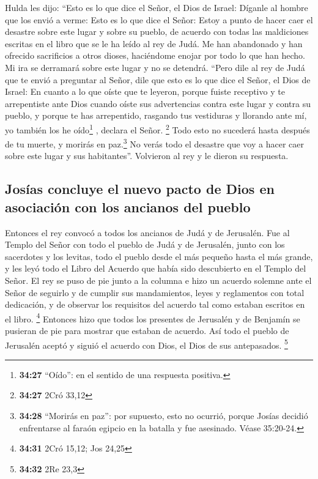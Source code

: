  Hulda les dijo: ``Esto es lo que dice el Señor, el Dios
de Israel: Díganle al hombre que los envió a verme:  Esto
es lo que dice el Señor: Estoy a punto de hacer caer el desastre sobre
este lugar y sobre su pueblo, de acuerdo con todas las maldiciones
escritas en el libro que se le ha leído al rey de Judá. 
Me han abandonado y han ofrecido sacrificios a otros dioses, haciéndome
enojar por todo lo que han hecho. Mi ira se derramará sobre este lugar y
no se detendrá.  ``Pero dile al rey de Judá que te envió
a preguntar al Señor, dile que esto es lo que dice el Señor, el Dios de
Israel: En cuanto a lo que oíste que te leyeron,  porque
fuiste receptivo y te arrepentiste ante Dios cuando oíste sus
advertencias contra este lugar y contra su pueblo, y porque te has
arrepentido, rasgando tus vestiduras y llorando ante mí, yo también los
he oído\footnote{\textbf{34:27} ``Oído'': en el sentido de una respuesta
  positiva.} , declara el Señor. \footnote{\textbf{34:27} 2Cró 33,12}
 Todo esto no sucederá hasta después de tu muerte, y
morirás en paz.\footnote{\textbf{34:28} ``Morirás en paz'': por
  supuesto, esto no ocurrió, porque Josías decidió enfrentarse al faraón
  egipcio en la batalla y fue asesinado. Véase 35:20-24.} No verás todo
el desastre que voy a hacer caer sobre este lugar y sus habitantes''.
Volvieron al rey y le dieron su respuesta.

\hypertarget{josuxedas-concluye-el-nuevo-pacto-de-dios-en-asociaciuxf3n-con-los-ancianos-del-pueblo}{%
\subsection{Josías concluye el nuevo pacto de Dios en asociación con los
ancianos del
pueblo}\label{josuxedas-concluye-el-nuevo-pacto-de-dios-en-asociaciuxf3n-con-los-ancianos-del-pueblo}}

 Entonces el rey convocó a todos los ancianos de Judá y
de Jerusalén.  Fue al Templo del Señor con todo el pueblo
de Judá y de Jerusalén, junto con los sacerdotes y los levitas, todo el
pueblo desde el más pequeño hasta el más grande, y les leyó todo el
Libro del Acuerdo que había sido descubierto en el Templo del Señor.
 El rey se puso de pie junto a la columna e hizo un
acuerdo solemne ante el Señor de seguirlo y de cumplir sus mandamientos,
leyes y reglamentos con total dedicación, y de observar los requisitos
del acuerdo tal como estaban escritos en el libro. \footnote{\textbf{34:31}
  2Cró 15,12; Jos 24,25}  Entonces hizo que todos los
presentes de Jerusalén y de Benjamín se pusieran de pie para mostrar que
estaban de acuerdo. Así todo el pueblo de Jerusalén aceptó y siguió el
acuerdo con Dios, el Dios de sus antepasados. \footnote{\textbf{34:32}
  2Re 23,3}

